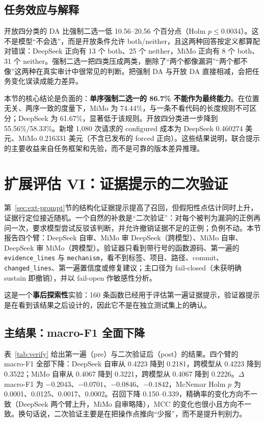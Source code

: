 \documentclass[conference]{IEEEtran}
\begin{document}
\subsection{任务效应与解释}

开放四分类的 DA 比强制二选一低 10.56--20.56 个百分点（Holm $p\le 0.0034$）。这不是模型“不会选”，而是开放条件允许 both/neither，且这两种回答按定义都算配对错误：DeepSeek 正向有 13 个 both、25 个 neither，MiMo 正向有 8 个 both、31 个 neither。强制二选一把四类压成两类，删除了“两个都像漏洞”“两个都不像”这两种在真实审计中很常见的判断。把强制 DA 与开放 DA 直接相减，会把任务变化误读成能力差异。

本节的核心结论是负面的：\textbf{单序强制二选一的 86.7\% 不能作为最终能力}。在位置无关、两序一致的度量下，MiMo 为 74.44\%，与一条不看代码的长度规则不可区分；DeepSeek 为 61.67\%，显著低于该规则。开放四分类进一步降到 55.56\%/58.33\%。新增 1{,}080 次请求的 configured 成本为 DeepSeek 0.460274 美元、MiMo 0.216331 美元（不含已发布的 forced 正向）。这些结果说明，联合提示的主要收益来自任务框架和先验，而不是可靠的版本差异推理。

\section{扩展评估 VI：证据提示的二次验证}
\label{sec:verify}

第~\ref{sec:ext-prompt}节的结构化证据提示提高了召回，但假阳性点估计同时上升，证据行定位接近随机。一个自然的补救是“二次验证”：对每个被判为漏洞的正例再问一次，要求模型尝试反驳该判断，并允许撤销证据不足的正例；负例不动。本节报告四个臂：DeepSeek 自审、MiMo 审 DeepSeek（跨模型）、MiMo 自审、DeepSeek 审 MiMo（跨模型）。验证器只看到带行号的函数源码、第一遍的 \texttt{evidence\_lines} 与 \texttt{mechanism}，看不到标签、项目、路径、commit、\texttt{changed\_lines}、第一遍置信度或修复建议；主口径为 fail-closed（未获明确 sustain 即撤销），并以 fail-open 作敏感性分析。

这是一个\textbf{事后探索性}实验：160 条函数已经用于评估第一遍证据提示，验证器提示是在看到该结果之后设计的，因此它不是在独立测试集上的确认。

\subsection{主结果：macro-F1 全面下降}

表~\ref{tab:verify} 给出第一遍（pre）与二次验证后（post）的结果。四个臂的 macro-F1 全部下降：DeepSeek 自审从 0.4223 降到 0.2181，跨模型从 0.4223 降到 0.3522；MiMo 自审从 0.4067 降到 0.3221，跨模型从 0.4067 降到 0.2226。$\Delta$macro-F1 为 $-0.2043$、$-0.0701$、$-0.0846$、$-0.1842$，McNemar Holm $p$ 为 0.0001、0.0125、0.0017、0.0002。召回下降 0.150--0.339，精确率的变化方向不一致（DeepSeek 两个臂上升，MiMo 自审略降），MCC 的变化也很小且方向不一致。换句话说，二次验证主要是在把操作点推向“少报”，而不是提升判别力。
\end{document}

